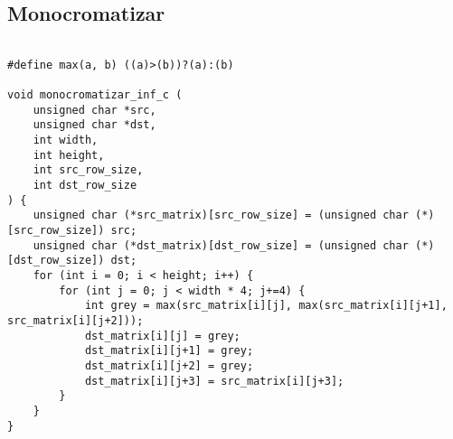 \subsection{Monocromatizar}



\begin{codesnippet}
\begin{verbatim}

#define max(a, b) ((a)>(b))?(a):(b)

void monocromatizar_inf_c (
	unsigned char *src, 
	unsigned char *dst, 
	int width, 
	int height, 
	int src_row_size, 
	int dst_row_size
) {
    unsigned char (*src_matrix)[src_row_size] = (unsigned char (*)[src_row_size]) src;
    unsigned char (*dst_matrix)[dst_row_size] = (unsigned char (*)[dst_row_size]) dst;
    for (int i = 0; i < height; i++) {
        for (int j = 0; j < width * 4; j+=4) {
            int grey = max(src_matrix[i][j], max(src_matrix[i][j+1], src_matrix[i][j+2]));
            dst_matrix[i][j] = grey;
            dst_matrix[i][j+1] = grey;
            dst_matrix[i][j+2] = grey;
            dst_matrix[i][j+3] = src_matrix[i][j+3];
        }
    }
}

\end{verbatim}
\end{codesnippet}
